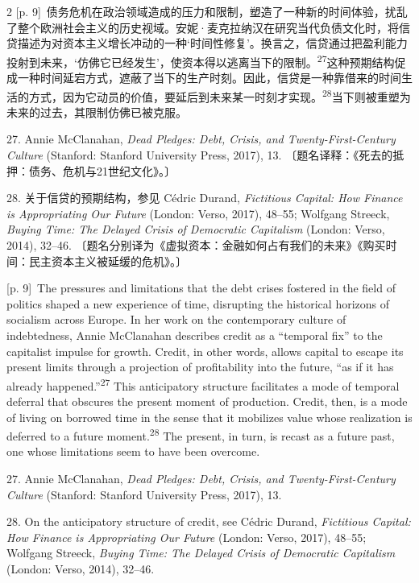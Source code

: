 \documentclass[10pt,a4paper]{article}
\begin{document}
\begin{paracol}{2}
{\scriptsize\color{gray} [p. 9]}\ 债务危机在政治领域造成的压力和限制，塑造了一种新的时间体验，扰乱了整个欧洲社会主义的历史视域。安妮·麦克拉纳汉在研究当代负债文化时，将信贷描述为对资本主义增长冲动的一种‘时间性修复’。换言之，信贷通过把盈利能力投射到未来，‘仿佛它已经发生’，使资本得以逃离当下的限\mbox{制。\textsuperscript{27}}这种预期结构促成一种时间延宕方式，遮蔽了当下的生产时刻。因此，信贷是一种靠借来的时间生活的方式，因为它动员的价值，要延后到未来某一时刻才实\mbox{现。\textsuperscript{28}}当下则被重塑为未来的过去，其限制仿佛已被克服。\par{\small 27. Annie McClanahan, \textit{Dead Pledges: Debt, Crisis, and Twenty-First-Century Culture} (Stanford: Stanford University Press, 2017), 13. 〔题名译释：《死去的抵押：债务、危机与21世纪文化》。〕\par}{\small 28. 关于信贷的预期结构，参见 Cédric Durand, \textit{Fictitious Capital: How Finance is Appropriating Our Future} (London: Verso, 2017), 48–55; Wolfgang Streeck, \textit{Buying Time: The Delayed Crisis of Democratic Capitalism} (London: Verso, 2014), 32–46. 〔题名分别译为《虚拟资本：金融如何占有我们的未来》《购买时间：民主资本主义被延缓的危机》。〕\par}
\switchcolumn
{\scriptsize\color{gray} [p. 9]}\ The pressures and limitations that the debt crises fostered in the field of politics shaped a new experience of time, disrupting the historical horizons of socialism across Europe. In her work on the contemporary culture of indebtedness, Annie McClanahan describes credit as a “temporal fix” to the capitalist impulse for growth. Credit, in other words, allows capital to escape its present limits through a projection of profitability into the future, “as if it has already happened.”\nobreak\textsuperscript{27} This anticipatory structure facilitates a mode of temporal deferral that obscures the present moment of production. Credit, then, is a mode of living on borrowed time in the sense that it mobilizes value whose realization is deferred to a future moment.\nobreak\textsuperscript{28} The present, in turn, is recast as a future past, one whose limitations seem to have been overcome.\par{\small 27. Annie McClanahan, \textit{Dead Pledges: Debt, Crisis, and Twenty-First-Century Culture} (Stanford: Stanford University Press, 2017), 13.\par}{\small 28. On the anticipatory structure of credit, see Cédric Durand, \textit{Fictitious Capital: How Finance is Appropriating Our Future} (London: Verso, 2017), 48–55; Wolfgang Streeck, \textit{Buying Time: The Delayed Crisis of Democratic Capitalism} (London: Verso, 2014), 32–46.\par}

\end{paracol}
\end{document}
